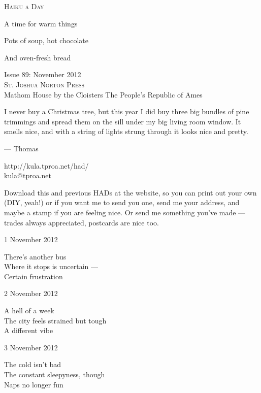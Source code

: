 \documentclass[12pt]{article}
\begin{document}
\begin{center}
{\fontsize{36}{48}\selectfont \textsc{Haiku a Day }}
\end{center}

\vspace*{3.5cm}

{\fontsize{20}{40}\selectfont 

A time for warm things 

Pots of soup, hot chocolate 

And oven-fresh bread

}

\vspace*{5.0cm}
\begin{center}
{\large{Issue 89: November 2012}} \\[5mm]
{\fontsize{8}{8}\selectfont  \textsc{ St. Joshua Norton Press }} \\[1mm]
{\fontsize{6}{6}\selectfont Mathom House by the Cloisters \textbar The People's Republic of Ames }
\end{center}


\newpage

I never buy a Christmas tree, but this year I did buy three big
bundles of pine trimmings and spread them on the sill under my
big living room window. It smells nice, and with a string of
lights strung through it looks nice and pretty.

--- Thomas

http://kula.tproa.net/had/ \\
kula@tproa.net

Download this and previous HADs at the website, so you can
print out your own (DIY, yeah!) or if you want me to send
you one, send me your address, and maybe a stamp if you
are feeling nice. Or send me something you've made ---
trades always appreciated, postcards are nice too.

\vfill

1 November 2012

There's another bus \\
Where it stops is uncertain --- \\
Certain frustration

2 November 2012

A hell of a week \\
The city feels strained but tough \\
A different vibe

\newpage

3 November 2012

The cold isn't bad \\
The constant sleepyness, though \\
Naps no longer fun
\end{document}
